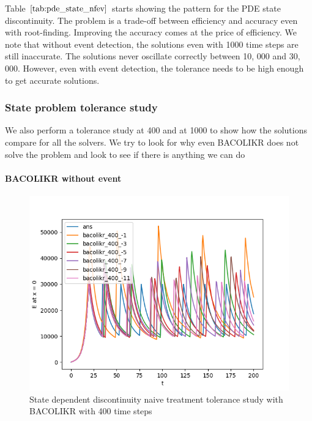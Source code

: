 \documentclass{article}
\begin{document}
Table $\ref{tab:pde_state_nfev}$ starts showing the pattern for the PDE state discontinuity. The problem is a trade-off between efficiency and accuracy even with root-finding. Improving the accuracy comes at the price of efficiency. We note that without event detection, the solutions even with 1000 time steps are still inaccurate. The solutions never oscillate correctly between 10, 000 and 30, 000. However, even with event detection, the tolerance needs to be high enough to get accurate solutions.

\subsubsection{State problem tolerance study}
\label{subsubsection:pde_state_tol_study}
We also perform a tolerance study at 400 and at 1000 to show how the solutions compare for all the solvers. We try to look for why even BACOLIKR does not solve the problem and look to see if there is anything we can do

\paragraph{BACOLIKR without event}
\begin{figure}[H]
\centering
\includegraphics[width=0.7\linewidth]{./figures/pde_state_disc_tol_bacolikr_naive_400}
\caption{State dependent discontinuity naive treatment tolerance study with BACOLIKR with 400 time steps}
\label{fig:pde_state_disc_tol_bacolikr_naive_400}
\end{figure}
\end{document}

